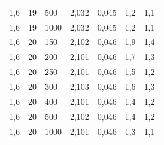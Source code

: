 \begin{tabular}{lllllll}
        1,6 & 19 & 500 & 2,032 & 0,045 & 1,2 & 1,1 \\ 
        1,6 & 19 & 1000 & 2,032 & 0,045 & 1,2 & 1,1 \\ 
        1,6 & 20 & 150 & 2,102 & 0,046 & 1,9 & 1,4 \\ 
        1,6 & 20 & 200 & 2,101 & 0,046 & 1,7 & 1,3 \\ 
        1,6 & 20 & 250 & 2,101 & 0,046 & 1,5 & 1,2 \\ 
        1,6 & 20 & 300 & 2,103 & 0,046 & 1,6 & 1,3 \\ 
        1,6 & 20 & 400 & 2,101 & 0,046 & 1,4 & 1,2 \\ 
        1,6 & 20 & 500 & 2,102 & 0,046 & 1,4 & 1,2 \\ 
        1,6 & 20 & 1000 & 2,101 & 0,046 & 1,3 & 1,1 \\ \hline
    \end{tabular}
  
